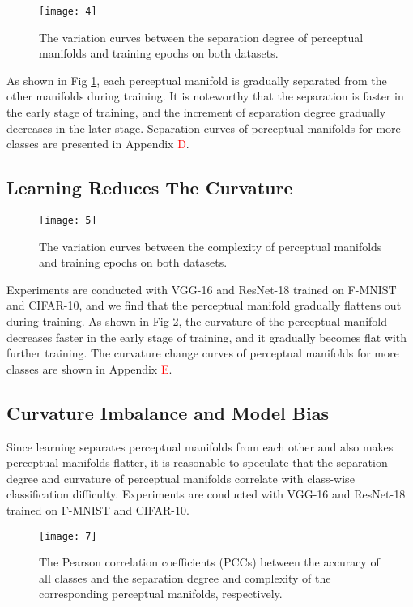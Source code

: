 \documentclass[10pt,twocolumn,letterpaper]{article}
\begin{document}
\begin{figure}[b]
\vskip -0.1in
\centering
\centerline{\texttt{[image: 4]}}
\vskip -0.10in
\caption{The variation curves between the separation degree of perceptual manifolds and training epochs on both datasets.}
\label{fig4}
\vskip -0.07in
\end{figure}

As shown in Fig \ref{fig4}, each perceptual manifold is gradually separated from the other manifolds during training. It is noteworthy that the separation is faster in the early stage of training, and the increment of separation degree gradually decreases in the later stage. Separation curves of perceptual manifolds for more classes are presented in Appendix \textcolor{red}{D}.

\subsection{Learning Reduces The Curvature}
\label{sec4.2}

\begin{figure}[h]
\centering
\centerline{\texttt{[image: 5]}}
\vskip -0.1in
\caption{The variation curves between the complexity of perceptual manifolds and training epochs on both datasets.}
\label{fig5}
\vskip -0.2in
\end{figure}

Experiments are conducted with VGG-16 and ResNet-18 trained on F-MNIST and CIFAR-10, and we find that the perceptual manifold gradually flattens out during training. As shown in Fig \ref{fig5}, the curvature of the perceptual manifold decreases faster in the early stage of training, and it gradually becomes flat with further training. The curvature change curves of perceptual manifolds for more classes are shown in Appendix \textcolor{red}{E}.

\subsection{Curvature Imbalance and Model Bias}
\label{sec4.3}

Since learning separates perceptual manifolds from each other and also makes perceptual manifolds flatter, it is reasonable to speculate that the separation degree and curvature of perceptual manifolds correlate with class-wise classification difficulty. Experiments are conducted with VGG-16 and ResNet-18 trained on F-MNIST and CIFAR-10.

\begin{figure}[h]
\centering
\vskip -0.05in
\centerline{\texttt{[image: 7]}}
\vskip -0.1in
\caption{The Pearson correlation coefficients (PCCs) between the accuracy of all classes and the separation degree and complexity of the corresponding perceptual manifolds, respectively.}
\label{fig6}
\vskip -0.07in
\end{figure}
\end{document}
